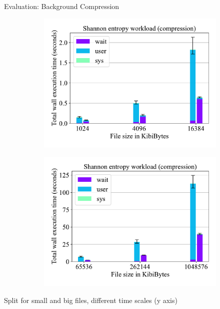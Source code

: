 \documentclass{beamer}
\begin{document}
\begin{frame}{Evaluation: Background Compression}
	\begingroup
	\begin{figure}
		\begin{subfigure}{0.5\textwidth}
			\centering
			\includegraphics[width=1.0\linewidth]{resources/images/results-shannon-lower.pdf}
		\end{subfigure}%
		\begin{subfigure}{0.5\textwidth}
			\centering
			\includegraphics[width=1.0\linewidth]{resources/images/results-shannon-upper.pdf}
		\end{subfigure}
	\end{figure}
	\tiny Split for small and big files, different time scales (y axis)
	\endgroup
\end{frame}
\end{document}
